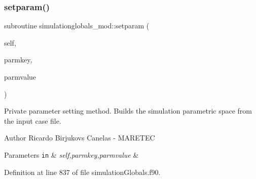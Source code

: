 \subsubsection{\texorpdfstring{setparam()}{setparam()}}
{\footnotesize\ttfamily subroutine simulationglobals\+\_\+mod\+::setparam (\begin{DoxyParamCaption}\item[{class(\mbox{\hyperlink{structsimulationglobals__mod_1_1parameters__t}{parameters\+\_\+t}}), intent(inout)}]{self,  }\item[{type(string), intent(in)}]{parmkey,  }\item[{type(string), intent(in)}]{parmvalue }\end{DoxyParamCaption})\hspace{0.3cm}{\ttfamily [private]}}



Private parameter setting method. Builds the simulation parametric space from the input case file. 

\begin{DoxyAuthor}{Author}
Ricardo Birjukovs Canelas -\/ M\+A\+R\+E\+T\+EC 
\end{DoxyAuthor}

\begin{DoxyParams}[1]{Parameters}
\mbox{\tt in}  & {\em self,parmkey,parmvalue} & \\
\hline
\end{DoxyParams}


Definition at line 837 of file simulation\+Globals.\+f90.


